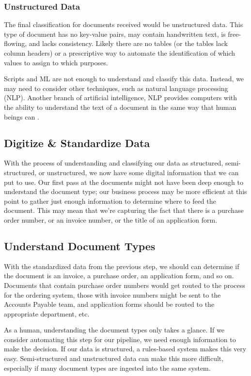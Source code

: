 \documentclass[conference]{IEEEtran}
\begin{document}
\subsubsection{Unstructured Data}
The final classification for documents received would be unstructured data. This type of document has no key-value pairs, may contain handwritten text, is free-flowing, and lacks consistency. Likely there are no tables (or the tables lack column headers) or a prescriptive way to automate the identification of which values to assign to which purposes.

Scripts and ML are not enough to understand and classify this data. Instead, we may need to consider other techniques, such as natural language processing (NLP). Another branch of artificial intelligence, NLP provides computers with the ability to understand the text of a document in the same way that human beings can \cite{ibm:nlp}.

\subsection{Digitize \& Standardize Data}
With the process of understanding and classifying our data as structured, semi-structured, or unstructured, we now have some digital information that we can put to use. Our first pass at the documents might not have been deep enough to understand the document type; our business process may be more efficient at this point to gather just enough information to determine where to feed the document. This may mean that we're capturing the fact that there is a purchase order number, or an invoice number, or the title of an application form. 

\subsection{Understand Document Types}
With the standardized data from the previous step, we should can determine if the document is an invoice, a purchase order, an application form, and so on. Documents that contain purchase order numbers would get routed to the process for the ordering system, those with invoice numbers might be sent to the Accounts Payable team, and application forms should be routed to the appropriate department, etc.

As a human, understanding the document types only takes a glance. If we consider automating this step for our pipeline, we need enough information to make the decision. If our data is structured, a rules-based system makes this very easy. Semi-structured and unstructured data can make this more difficult, especially if many document types are ingested into the same system. 
\end{document}
